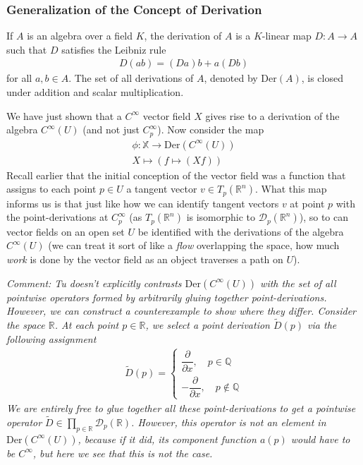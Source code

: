 \documentclass{article}
\newcommand{\R}{\mathbb{R}}
\newcommand{\Cinfty}{C^{\infty}}
\begin{document}
	\subsubsection*{Generalization of the Concept of Derivation}
	If $A$ is an algebra over a field $K$, the derivation of $A$ is a $K$-linear map $D: A \to A$ such that $D$ satisfies the Leibniz rule
	\begin{gather*}
		D(ab) = (Da)b + a(Db)
	\end{gather*}
	for all $a, b \in A$. The set of all derivations of $A$, denoted by $\text{Der}(A)$, is closed under addition and scalar multiplication.
	
	We have just shown that a $\Cinfty$ vector field $X$ gives rise to a derivation of the algebra $\Cinfty(U)$ (and not just $\Cinfty_p$). Now consider the map
	\begin{gather*}
		\phi: \mathbb{X} \to \text{Der}(\Cinfty(U)) \\
		X \mapsto (f \mapsto (Xf))
	\end{gather*}
	Recall earlier that the initial conception of the vector field was a function that assigns to each point $p \in U$ a tangent vector $v \in T_p(\R^n)$. What this map informs us is that just like how we can identify tangent vectors $v$ at point $p$ with the point-derivations at $\Cinfty_p$ (as $T_p(\R^n)$ is isomorphic to $\mathcal{D}_p(\R^n)$), so to can vector fields on an open set $U$ be identified with the derivations of the algebra $\Cinfty(U)$ (we can treat it sort of like a \textit{flow} overlapping the space, how much \textit{work} is done by the vector field as an object traverses a path on $U$).
	
	\noindent \textit{Comment: Tu doesn't explicitly contrasts $\text{Der}(\Cinfty(U))$ with the set of all pointwise operators formed by arbitrarily gluing together point-derivations. However, we can construct a counterexample to show where they differ. Consider the space $\R$. At each point $p \in \R$, we select a point derivation $\tilde{D}(p)$ via the following assignment}
	\begin{gather*}
		\tilde{D}(p) = \begin{cases}
			\dfrac{\partial }{\partial x}, \quad p \in \mathbb{Q} \\
			-\dfrac{\partial }{\partial x}, \quad p \notin \mathbb{Q}
		\end{cases}
	\end{gather*}
	\textit{We are entirely free to glue together all these point-derivations to get a pointwise operator $\tilde{D} \in \prod_{p \in \mathbb{R}} \mathcal{D}_p(\mathbb{R})$. However, this operator is not an element in $\text{Der}(\Cinfty(U))$, because if it did, its component function $a(p)$ would have to be $\Cinfty$, but here we see that this is not the case.}
	
\end{document}
